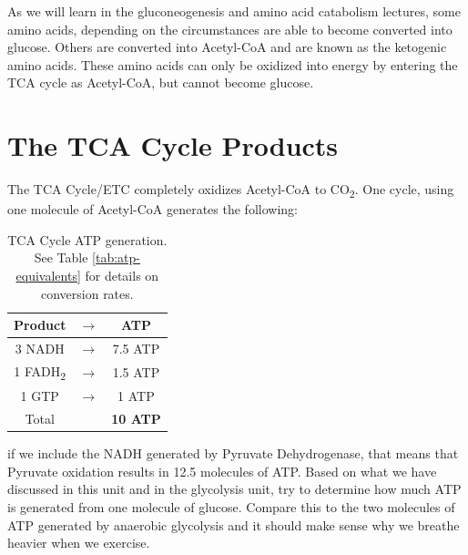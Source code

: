 \documentclass{tufte-handout}
\begin{document}
  As we will learn in the gluconeogenesis and amino acid catabolism lectures, some amino acids, depending on the circumstances are able to become converted into glucose.  Others are converted into Acetyl-CoA and are known as the ketogenic amino acids.  These amino acids can only be oxidized into energy by entering the TCA cycle as Acetyl-CoA, but cannot become glucose.

\section{The TCA Cycle Products}

The TCA Cycle/ETC completely oxidizes Acetyl-CoA to CO\textsubscript{2}.  One cycle, using one molecule of Acetyl-CoA generates the following:

\begin{table}
\centering
\caption{TCA Cycle ATP generation.  See Table \ref{tab:atp-equivalents} for details on conversion rates.}
\label{tab:atp-tca}
\begin{tabular}{ccc}
\hline
\textbf {Product} & $\rightarrow$ & \textbf{ATP}\\
\hline
3 NADH & $\rightarrow$ & 7.5 ATP \\
1 FADH\textsubscript{2} & $\rightarrow$ &  1.5 ATP  \\
1 GTP & $\rightarrow$ &  1 ATP  \\
\hline
Total & & \textbf{10 ATP}\\
\end{tabular}
\end{table}

if we include the NADH generated by Pyruvate Dehydrogenase, that means that Pyruvate oxidation results in 12.5 molecules of ATP.  Based on what we have discussed in this unit and in the glycolysis unit, try to determine how much ATP is generated from one molecule of glucose.  Compare this to the two molecules of ATP generated by anaerobic glycolysis and it should make sense why we breathe heavier when we exercise.
\end{document}
